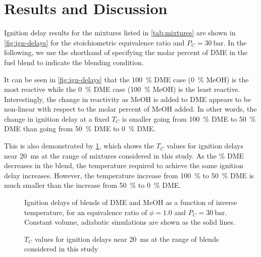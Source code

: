 \documentclass[12pt]{ussci}
\begin{document}
\section{Results and Discussion}\label{sec:results-and-discussion}

Ignition delay results for the mixtures listed in \cref{tab:mixtures} are shown
in \cref{fig:ign-delays} for the stoichiometric equivalence ratio and \(P_C =
\SI[number-unit-product={\ }]{30}{\bar}\). In the following, we use the
shorthand of specifying the molar percent of DME in the fuel blend to indicate
the blending condition.

It can be seen in \cref{fig:ign-delays} that the \SI{100}{\percent} DME case
(\SI{0}{\percent} MeOH) is the most reactive while the \SI{0}{\percent} DME case
(\SI{100}{\percent} MeOH) is the least reactive. Interestingly, the change in
reactivity as MeOH is added to DME appears to be non-linear with respect to the
molar percent of MeOH added. In other words, the change in ignition delay at a
fixed \(T_C\) is smaller going from \SI{100}{\percent} DME to \SI{50}{\percent}
DME than going from \SI{50}{\percent} DME to \SI{0}{\percent} DME.

This is also demonstrated by \cref{fig:temp-comp}, which shows the \(T_C\)
values for ignition delays near \SI{20}{\ms} at the range of mixtures considered
in this study. As the \si{\percent} DME decreases in the blend, the temperature
required to achieve the same ignition delay increases. However, the temperature
increase from \SI{100}{\percent} to \SI{50}{\percent} DME is much smaller than
the increase from \SI{50}{\percent} to \SI{0}{\percent} DME.

\begin{figure}[htb]
    \begin{minipage}[t]{0.48\textwidth}
        \centering
        \resizebox{\linewidth}{!}{}
        \caption{Ignition delays of blends of DME and MeOH as a function of
        inverse temperature, for an equivalence ratio of \(\phi = 1.0\) and
        \(P_C = \SI[number-unit-product={\ }]{30}{\bar}\). Constant volume,
        adiabatic simulations are shown as the solid lines.}
        \label{fig:ign-delays}
    \end{minipage}\hfill%
    \begin{minipage}[t]{0.48\textwidth}
        \centering
        \resizebox{\linewidth}{!}{}
        \caption{\(T_C\) values for ignition delays near \SI{20}{\ms} at the
        range of blends considered in this study}
        \label{fig:temp-comp}
    \end{minipage}\hfill%
\end{figure}
\end{document}
